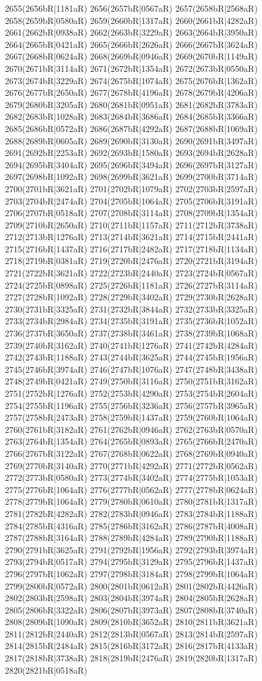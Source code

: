 2655(2656bR|1181aR) 2656(2657bR|0567aR) 2657(2658bR|2568aR) 2658(2659bR|0580aR) 2659(2660bR|1317aR) 2660(2661bR|4282aR) 2661(2662bR|0938aR) 2662(2663bR|3229aR) 2663(2664bR|3950aR) 2664(2665bR|0421aR) 2665(2666bR|2626aR) 2666(2667bR|3624aR) 2667(2668bR|0624aR) 2668(2669bR|0946aR) 2669(2670bR|1149aR) 2670(2671bR|3114aR) 2671(2672bR|1354aR) 2672(2673bR|0550aR) 2673(2674bR|3229aR) 2674(2675bR|1074aR) 2675(2676bR|1362aR) 2676(2677bR|2650aR) 2677(2678bR|4196aR) 2678(2679bR|4206aR) 2679(2680bR|3205aR) 2680(2681bR|0951aR) 2681(2682bR|3783aR) 2682(2683bR|1028aR) 2683(2684bR|3686aR) 2684(2685bR|3366aR) 2685(2686bR|0572aR) 2686(2687bR|4292aR) 2687(2688bR|1069aR) 2688(2689bR|0605aR) 2689(2690bR|3130aR) 2690(2691bR|3497aR) 2691(2692bR|2253aR) 2692(2693bR|1580aR) 2693(2694bR|2628aR) 2694(2695bR|3404aR) 2695(2696bR|3494aR) 2696(2697bR|3127aR) 2697(2698bR|1092aR) 2698(2699bR|3621aR) 2699(2700bR|3714aR) 2700(2701bR|3621aR) 2701(2702bR|1079aR) 2702(2703bR|2597aR) 2703(2704bR|2474aR) 2704(2705bR|1064aR) 2705(2706bR|3191aR) 2706(2707bR|0518aR) 2707(2708bR|3114aR) 2708(2709bR|1354aR) 2709(2710bR|2650aR) 2710(2711bR|1157aR) 2711(2712bR|3738aR) 2712(2713bR|1276aR) 2713(2714bR|3621aR) 2714(2715bR|2441aR) 2715(2716bR|1437aR) 2716(2717bR|2482aR) 2717(2718bR|1134aR) 2718(2719bR|0381aR) 2719(2720bR|2476aR) 2720(2721bR|3194aR) 2721(2722bR|3621aR) 2722(2723bR|2440aR) 2723(2724bR|0567aR) 2724(2725bR|0898aR) 2725(2726bR|1181aR) 2726(2727bR|3114aR) 2727(2728bR|1092aR) 2728(2729bR|3402aR) 2729(2730bR|2628aR) 2730(2731bR|3325aR) 2731(2732bR|3844aR) 2732(2733bR|3325aR) 2733(2734bR|2984aR) 2734(2735bR|3191aR) 2735(2736bR|1052aR) 2736(2737bR|3650aR) 2737(2738bR|3461aR) 2738(2739bR|1068aR) 2739(2740bR|3162aR) 2740(2741bR|1276aR) 2741(2742bR|4284aR) 2742(2743bR|1188aR) 2743(2744bR|3625aR) 2744(2745bR|1956aR) 2745(2746bR|3974aR) 2746(2747bR|1076aR) 2747(2748bR|3438aR) 2748(2749bR|0421aR) 2749(2750bR|3116aR) 2750(2751bR|3162aR) 2751(2752bR|1276aR) 2752(2753bR|4290aR) 2753(2754bR|2604aR) 2754(2755bR|1196aR) 2755(2756bR|3236aR) 2756(2757bR|3965aR) 2757(2758bR|2473aR) 2758(2759bR|1437aR) 2759(2760bR|1064aR) 2760(2761bR|3182aR) 2761(2762bR|0946aR) 2762(2763bR|0570aR) 2763(2764bR|1354aR) 2764(2765bR|0893aR) 2765(2766bR|2470aR) 2766(2767bR|3122aR) 2767(2768bR|0622aR) 2768(2769bR|0940aR) 2769(2770bR|3140aR) 2770(2771bR|4292aR) 2771(2772bR|0562aR) 2772(2773bR|0580aR) 2773(2774bR|3402aR) 2774(2775bR|1053aR) 2775(2776bR|1064aR) 2776(2777bR|0562aR) 2777(2778bR|0624aR) 2778(2779bR|1064aR) 2779(2780bR|0610aR) 2780(2781bR|1317aR) 2781(2782bR|4282aR) 2782(2783bR|0946aR) 2783(2784bR|1188aR) 2784(2785bR|4316aR) 2785(2786bR|3162aR) 2786(2787bR|4008aR) 2787(2788bR|3164aR) 2788(2789bR|4284aR) 2789(2790bR|1188aR) 2790(2791bR|3625aR) 2791(2792bR|1956aR) 2792(2793bR|3974aR) 2793(2794bR|0517aR) 2794(2795bR|3129aR) 2795(2796bR|1437aR) 2796(2797bR|1062aR) 2797(2798bR|3184aR) 2798(2799bR|1064aR) 2799(2800bR|0572aR) 2800(2801bR|0612aR) 2801(2802bR|4426aR) 2802(2803bR|2598aR) 2803(2804bR|3974aR) 2804(2805bR|2628aR) 2805(2806bR|3322aR) 2806(2807bR|3973aR) 2807(2808bR|3740aR) 2808(2809bR|1090aR) 2809(2810bR|3652aR) 2810(2811bR|3621aR) 2811(2812bR|2440aR) 2812(2813bR|0567aR) 2813(2814bR|2597aR) 2814(2815bR|2484aR) 2815(2816bR|3172aR) 2816(2817bR|4133aR) 2817(2818bR|3738aR) 2818(2819bR|2476aR) 2819(2820bR|1317aR) 2820(2821bR|0518aR) 